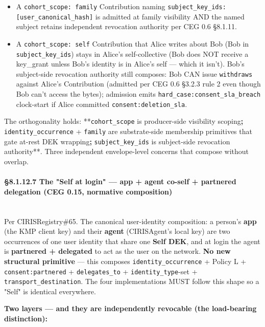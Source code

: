 \documentclass[11pt]{article}
\begin{document}
\begin{itemize}\setlength\itemsep{0pt}
\item A \texttt{cohort\_scope: family} Contribution naming \texttt{subject\_key\_ids: [user\_canonical\_hash]} is admitted at family visibility AND the named subject retains independent revocation authority per CEG 0.6 §8.1.11.
\item A \texttt{cohort\_scope: self} Contribution that Alice writes about Bob (Bob in \texttt{subject\_key\_ids}) stays in Alice's self-collective (Bob does NOT receive a key\_grant unless Bob's identity is in Alice's self — which it isn't). Bob's subject-side revocation authority still composes: Bob CAN issue \texttt{withdraws} against Alice's Contribution (admitted per CEG 0.6 §3.2.3 rule 2 even though Bob can't access the bytes); admission emits \texttt{hard\_case:consent\_sla\_breach} clock-start if Alice committed \texttt{consent:deletion\_sla}.
\end{itemize}


The orthogonality holds: **\texttt{cohort\_scope} is producer-side visibility scoping\textbf{; }\texttt{identity\_occurrence} + \texttt{family} are substrate-side membership primitives that gate at-rest DEK wrapping\textbf{; }\texttt{subject\_key\_ids} is subject-side revocation authority**. Three independent envelope-level concerns that compose without overlap.


\paragraph{§8.1.12.7 The "Self at login" — app + agent co-self + partnered delegation (CEG 0.15, normative composition)}\mbox{}\\


Per CIRISRegistry\#65. The canonical user-identity composition: a person's \textbf{app} (the KMP client key) and their \textbf{agent} (CIRISAgent's local key) are two occurrences of one user identity that share one \textbf{Self DEK}, and at login the agent is \textbf{partnered + delegated} to act as the user on the network. \textbf{No new structural primitive} — this composes \texttt{identity\_occurrence} + Policy L + \texttt{consent:partnered} + \texttt{delegates\_to} + \texttt{identity\_type}-set + \texttt{transport\_destination}. The four implementations MUST follow this shape so a "Self" is identical everywhere.



\textbf{Two layers — and they are independently revocable (the load-bearing distinction):}
\end{document}
